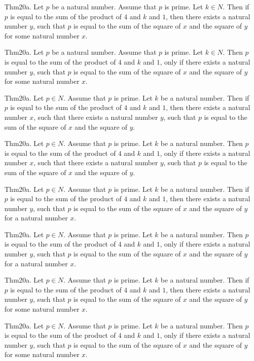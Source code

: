 \documentclass{article}
\begin{document}
Thm20a. Let $p$ be a natural number. Assume that $p$ is prime. Let $k \in N$. Then if $p$ is equal to the sum of the product of $4$ and $k$ and $1$, then there exists a natural number $y$, such that $p$ is equal to the sum of the square of $x$ and the square of $y$ for some natural number $x$.

Thm20a. Let $p$ be a natural number. Assume that $p$ is prime. Let $k \in N$. Then $p$ is equal to the sum of the product of $4$ and $k$ and $1$, only if there exists a natural number $y$, such that $p$ is equal to the sum of the square of $x$ and the square of $y$ for some natural number $x$.

Thm20a. Let $p \in N$. Assume that $p$ is prime. Let $k$ be a natural number. Then if $p$ is equal to the sum of the product of $4$ and $k$ and $1$, then there exists a natural number $x$, such that there exists a natural number $y$, such that $p$ is equal to the sum of the square of $x$ and the square of $y$.

Thm20a. Let $p \in N$. Assume that $p$ is prime. Let $k$ be a natural number. Then $p$ is equal to the sum of the product of $4$ and $k$ and $1$, only if there exists a natural number $x$, such that there exists a natural number $y$, such that $p$ is equal to the sum of the square of $x$ and the square of $y$.

Thm20a. Let $p \in N$. Assume that $p$ is prime. Let $k$ be a natural number. Then if $p$ is equal to the sum of the product of $4$ and $k$ and $1$, then there exists a natural number $y$, such that $p$ is equal to the sum of the square of $x$ and the square of $y$ for a natural number $x$.

Thm20a. Let $p \in N$. Assume that $p$ is prime. Let $k$ be a natural number. Then $p$ is equal to the sum of the product of $4$ and $k$ and $1$, only if there exists a natural number $y$, such that $p$ is equal to the sum of the square of $x$ and the square of $y$ for a natural number $x$.

Thm20a. Let $p \in N$. Assume that $p$ is prime. Let $k$ be a natural number. Then if $p$ is equal to the sum of the product of $4$ and $k$ and $1$, then there exists a natural number $y$, such that $p$ is equal to the sum of the square of $x$ and the square of $y$ for some natural number $x$.

Thm20a. Let $p \in N$. Assume that $p$ is prime. Let $k$ be a natural number. Then $p$ is equal to the sum of the product of $4$ and $k$ and $1$, only if there exists a natural number $y$, such that $p$ is equal to the sum of the square of $x$ and the square of $y$ for some natural number $x$.
\end{document}
